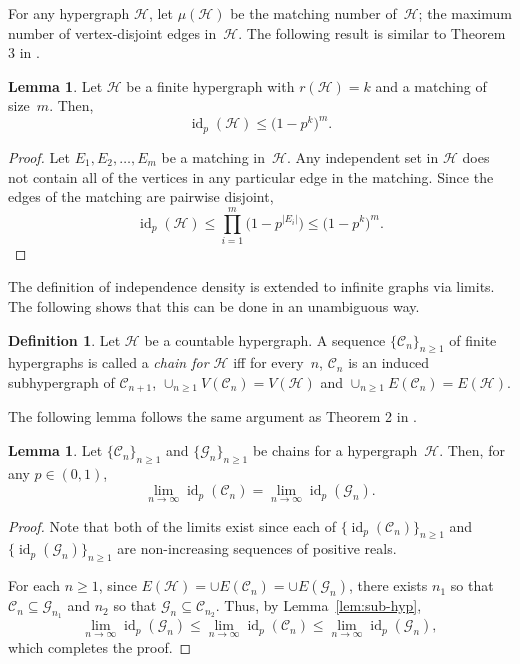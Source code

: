 \documentclass[11pt,reqno]{amsart}
\theoremstyle{definition}
\newtheorem{lemma}[theorem]{Lemma}
\newtheorem{definition}[theorem]{Definition}
\begin{document}
For any hypergraph $\mathcal{H}$, let $\mu(\mathcal{H})$ be the matching number of~$\mathcal{H}$; the maximum number of vertex-disjoint edges in~$\mathcal{H}$.  The following result is similar to Theorem 3 in \cite{BBMP14}.

\begin{lemma}\label{lem:match-bd}
Let $\mathcal{H}$ be a finite hypergraph with $r(\mathcal{H}) = k$ and a matching of size~$m$. Then,
\[
 {\operatorname{id}}_p(\mathcal{H}) \leq \big(1 - p^k \big)^m.
\]
\end{lemma}
\begin{proof}
Let $E_1, E_2, \dots, E_m$ be a matching in~$\mathcal{H}$. Any independent set in $\mathcal{H}$ does not contain all of the vertices in any particular edge in the matching. Since the edges of the matching are pairwise disjoint,
\[
 {\operatorname{id}}_p(\mathcal{H}) \leq \prod_{i = 1}^{m}\big(1-p^{|E_i|}\big) \leq \big(1 - p^k \big)^m.
\]
\end{proof}

The definition of independence density is extended to infinite graphs via limits. The following shows that this can be done in an unambiguous way.

\begin{definition}
Let $\mathcal{H}$ be a countable hypergraph. A sequence $\{\mathcal{C}_n\}_{n \geq 1}$ of finite hypergraphs is called a \emph{chain for $\mathcal{H}$} if{f} for every~$n$, $\mathcal{C}_n$ is an induced subhypergraph of $\mathcal{C}_{n+1}$, $\cup_{n \geq 1} V(\mathcal{C}_n) = V(\mathcal{H})$ and $\cup_{n \geq 1} E(\mathcal{C}_n) = E(\mathcal{H})$.
\end{definition}

The following lemma follows the same argument as Theorem 2 in \cite{BBMP14}.

\begin{lemma}
Let $\{\mathcal{C}_n\}_{n \geq 1}$ and $\{\mathcal{G}_n\}_{n \geq 1}$ be chains for a hypergraph~$\mathcal{H}$. Then, for any $p \in (0,1)$,
\[
 \lim_{n \to \infty} {\operatorname{id}}_p(\mathcal{C}_n) = \lim_{n \to \infty} {\operatorname{id}}_p(\mathcal{G}_n).
\]
\end{lemma}
\begin{proof}
Note that both of the limits exist since each of $\{{\operatorname{id}}_p(\mathcal{C}_n)\}_{n \geq 1}$ and $\{{\operatorname{id}}_p(\mathcal{G}_n)\}_{n \geq 1}$ are non-increasing sequences of positive reals.

For each $n \geq 1$, since $E(\mathcal{H}) = \cup E(\mathcal{C}_n) = \cup E(\mathcal{G}_n)$, there exists $n_1$ so that $\mathcal{C}_n \subseteq \mathcal{G}_{n_1}$ and $n_2$ so that $\mathcal{G}_n \subseteq \mathcal{C}_{n_2}$. Thus, by Lemma~\ref{lem:sub-hyp},
\[
 \lim_{n \to \infty} {\operatorname{id}}_p(\mathcal{G}_n) \leq \lim_{n \to \infty} {\operatorname{id}}_p(\mathcal{C}_n) \leq \lim_{n \to \infty} {\operatorname{id}}_p(\mathcal{G}_n),
\]
which completes the proof.
\end{proof}
\end{document}
